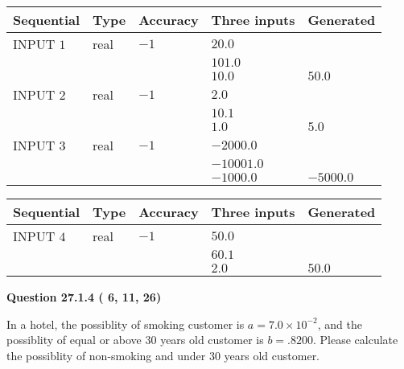\documentclass[12pt]{article}
\begin{document}
  
\noindent\begin{tabular}{|l|l|l|l|l|}
\hline
 Sequential & Type & Accuracy & Three inputs & Generated \\ 
\hline
 
 
  INPUT $           1$ & real & $          -1 $ & $
 20.0
  $ & \\
  & & &  $
 101.0
  $ & \\
  & & &  $
 10.0
 $ & $ 50.0 $ 
 \\  \hline  
 
 
  INPUT $           2$ & real & $          -1 $ & $
 2.0
  $ & \\
  & & &  $
 10.1
  $ & \\
  & & &  $
 1.0
 $ & $ 5.0 $ 
 \\  \hline  
 
 
  INPUT $           3$ & real & $          -1 $ & $
 -2000.0
  $ & \\
  & & &  $
 -10001.0
  $ & \\
  & & &  $
 -1000.0
 $ & $ -5000.0 $ 
 \\  \hline  
 \end{tabular}
   
   
  
  
\noindent\begin{tabular}{|l|l|l|l|l|}
\hline
 Sequential & Type & Accuracy & Three inputs & Generated \\ 
\hline
 
 
  INPUT $           4$ & real & $          -1 $ & $
 50.0
  $ & \\
  & & &  $
 60.1
  $ & \\
  & & &  $
 2.0
 $ & $ 50.0 $ 
 \\  \hline  
 \end{tabular}
   
   
  
\vspace{0.2in}
  
{\textbf{\Large{Question
27.1.4 
 (          6,         11,         26)
}}}
  
  
In a hotel, the possiblity of  %
smoking customer is
$a =  %
7.0 \times 10^{-2}$, and the possiblity of  %
equal or above 30 years old customer is $ b =  %
.8200$.
Please calculate the possiblity of  %
 non-smoking and  %
under 30 years old customer.
 
 
 
\noindent{}
 
\end{document}
